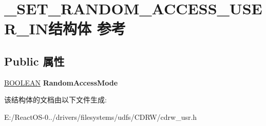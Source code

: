 \hypertarget{struct___s_e_t___r_a_n_d_o_m___a_c_c_e_s_s___u_s_e_r___i_n}{}\section{\+\_\+\+S\+E\+T\+\_\+\+R\+A\+N\+D\+O\+M\+\_\+\+A\+C\+C\+E\+S\+S\+\_\+\+U\+S\+E\+R\+\_\+\+I\+N结构体 参考}
\label{struct___s_e_t___r_a_n_d_o_m___a_c_c_e_s_s___u_s_e_r___i_n}
\subsection*{Public 属性}
\begin{DoxyCompactItemize}
\item 
\mbox{\label{struct___s_e_t___r_a_n_d_o_m___a_c_c_e_s_s___u_s_e_r___i_n_a7b36e2be081c9f8290cd6681f542fe15}} 
\hyperlink{_processor_bind_8h_a112e3146cb38b6ee95e64d85842e380a}{B\+O\+O\+L\+E\+AN} {\bfseries Random\+Access\+Mode}
\end{DoxyCompactItemize}


该结构体的文档由以下文件生成\+:\begin{DoxyCompactItemize}
\item 
E\+:/\+React\+O\+S-\/0../drivers/filesystems/udfs/\+C\+D\+R\+W/cdrw\+\_\+usr.\+h\end{DoxyCompactItemize}
